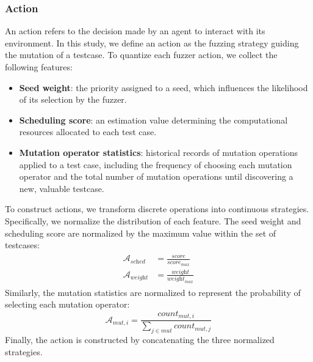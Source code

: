 \documentclass[lettersize,journal]{IEEEtran}
\begin{document}
\subsubsection{Action}
An action refers to the decision made by an agent to interact with its environment. In this study, we define an action as the fuzzing strategy guiding the mutation of a testcase. To quantize each fuzzer action, we collect the following features:
\begin{itemize} 
	\item \textbf{Seed weight}: the priority assigned to a seed, which influences the likelihood of its selection by the fuzzer.
	\item \textbf{Scheduling score}: an estimation value determining the computational resources allocated to each test case.
	\item \textbf{Mutation operator statistics}: historical records of mutation operations applied to a test case, including the frequency of choosing each mutation operator and the total number of mutation operations until discovering a new, valuable testcase.
\end{itemize}
To construct actions, we transform discrete operations into continuous strategies. Specifically, we normalize the distribution of each feature. The seed weight and scheduling score are normalized by the maximum value within the set of testcases:
\begin{align}
	\begin{split}
		\mathcal{A}_{\textit{sched}} &= \frac{\textit{score}}{\textit{score}_{\textit{max}}} \\
		\mathcal{A}_{\textit{weight}} &= \frac{\textit{weight}}{\textit{weight}_{\textit{max}}}
	\end{split}
\end{align}
Similarly, the mutation statistics are normalized to represent the probability of selecting each mutation operator:
\begin{equation}
	\mathcal{A}_{\textit{mut}, i} = \frac{count_{\textit{mut}, i}}{\sum_{j \in \textit{mut}} count_{\textit{mut}, j}}
\end{equation}
Finally, the action is constructed by concatenating the three normalized strategies.
\end{document}
